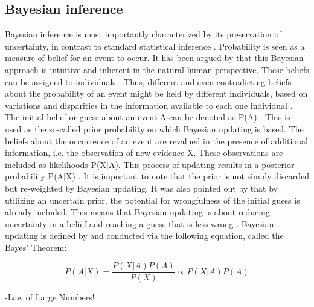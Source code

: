        \subsection{Bayesian inference}
        Bayesian inference is most importantly characterized by its preservation of uncertainty, in contrast to standard statistical inference \citep{davidson2015}. Probability is seen as a measure of belief for an event to occur. It has been argued by \cite{davidson2015}  that this Bayesian approach is intuitive and inherent in the natural human perspective. These beliefs can be assigned to individuals \citep{davidson2015}. Thus, different and even contradicting beliefs about the probability of an event might be held by different individuals, based on variations and disparities in the information available to each one individual \citep{davidson2015}.\\
        The initial belief or guess about an event A can be denoted as P(A) \citep{davidson2015}. This is used as the so-called prior probability on which Bayesian updating is based. The beliefs about the occurrence of an event are revalued in the presence of additional information, i.e. the observation of new evidence X. These observations are included as likelihoods P(X$|$A). This process of updating results in a posterior probability P(A$|$X) \citep{davidson2015}. It is important to note that the prior is not simply discarded but re-weighted by Bayesian updating. It was also pointed out by \citet{davidson2015} that by utilizing an uncertain prior, the potential for wrongfulness of the initial guess is already included. This means that Bayesian updating is about reducing uncertainty in a belief and reaching a guess that is less wrong \citep{davidson2015}.
        Bayesian updating is defined by and conducted via the following equation, called the Bayes' Theorem:
        
        \begin{equation}\label{eq:BayesTheorem}
        P(A|X) = \frac{P(X|A)P(A)}{P(X)}
        \propto P(X|A)P(A)
        \end{equation}
     
        -Law of Large Numbers!
                
